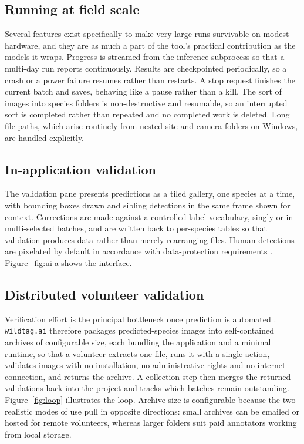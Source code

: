 \documentclass[11pt]{article}
\begin{document}
\subsection{Running at field scale}
Several features exist specifically to make very large runs survivable on modest
hardware, and they are as much a part of the tool's practical contribution as the
models it wraps. Progress is streamed from the inference subprocess so that a
multi-day run reports continuously. Results are checkpointed periodically, so a
crash or a power failure resumes rather than restarts. A stop request finishes
the current batch and saves, behaving like a pause rather than a kill. The sort
of images into species folders is non-destructive and resumable, so an
interrupted sort is completed rather than repeated and no completed work is
deleted. Long file paths, which arise routinely from nested site and camera
folders on Windows, are handled explicitly.

\subsection{In-application validation}
The validation pane presents predictions as a tiled gallery, one species at a
time, with bounding boxes drawn and sibling detections in the same frame shown
for context. Corrections are made against a controlled label vocabulary, singly
or in multi-selected batches, and are written back to per-species tables so that
validation produces data rather than merely rearranging files. Human detections
are pixelated by default in accordance with data-protection requirements \cw.
Figure~\ref{fig:ui}a shows the interface.

\subsection{Distributed volunteer validation}
Verification effort is the principal bottleneck once prediction is automated \cw.
\texttt{wildtag.ai} therefore packages predicted-species images into
self-contained archives of configurable size, each bundling the application and a
minimal runtime, so that a volunteer extracts one file, runs it with a single
action, validates images with no installation, no administrative rights and no
internet connection, and returns the archive. A collection step then merges the
returned validations back into the project and tracks which batches remain
outstanding. Figure~\ref{fig:loop} illustrates the loop. Archive size is
configurable because the two realistic modes of use pull in opposite directions:
small archives can be emailed or hosted for remote volunteers, whereas larger
folders suit paid annotators working from local storage.
\end{document}
